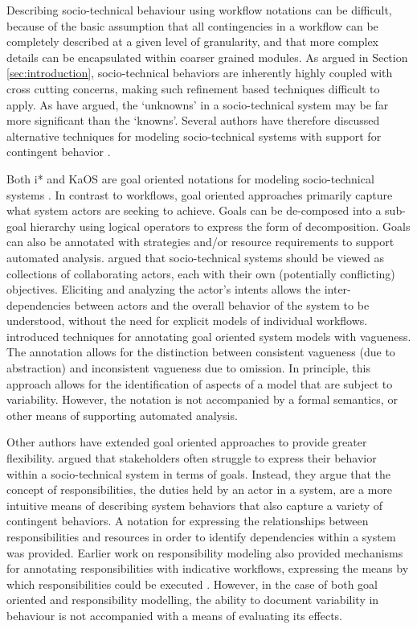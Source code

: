 \documentclass{llncs}
\begin{document}
Describing socio-technical behaviour using workflow notations can be difficult, because of the basic assumption that all
contingencies in a workflow can be completely described at a given level of granularity, and that more complex details
can be encapsulated within coarser grained modules.  As argued in Section \ref{sec:introduction}, socio-technical
behaviors are inherently highly coupled with cross cutting concerns, making such refinement based techniques difficult
to apply.  As \citet{israilidis13ignorance} have argued, the `unknowns' in a socio-technical system may be far more
significant than the `knowns'. Several authors have therefore discussed alternative techniques for modeling
socio-technical systems with support for contingent behavior
\citep{dardenne93goal,sommerville09deriving,voinov13integronsters,yu1995social}.

Both i* \citep{yu1995social} and KaOS \citep{dardenne93goal} are goal oriented notations for modeling socio-technical
systems \cite{werneck2009goreistarkaos}.  In contrast to workflows, goal oriented approaches primarily capture what
system actors are seeking to achieve.  Goals can be de-composed into a sub-goal hierarchy using logical operators to
express the form of decomposition. Goals can also be annotated with strategies and/or resource requirements to support
automated analysis.  \citet{yu1995social} argued that socio-technical systems should be viewed as collections of
collaborating actors, each with their own (potentially conflicting) objectives.  Eliciting and analyzing the actor’s
intents allows the inter-dependencies between actors and the overall behavior of the system to be understood, without
the need for explicit models of individual workflows. \citet{herrmann1999vagueness} introduced techniques for annotating
goal oriented system models with vagueness.  The annotation allows for the distinction between consistent vagueness (due
to abstraction) and inconsistent vagueness due to omission.  In principle, this approach allows for the identification
of aspects of a model that are subject to variability.  However, the notation is not accompanied by a formal semantics,
or other means of supporting automated analysis.

Other authors have extended goal oriented approaches to provide greater flexibility. \citet{sommerville09deriving}
argued that stakeholders often struggle to express their behavior within a socio-technical system in terms of goals.
Instead, they argue that the concept of responsibilities, the duties held by an actor in a system, are a more intuitive
means of describing system behaviors that also capture a variety of contingent behaviors.  A notation for expressing the
relationships between responsibilities and resources in order to identify dependencies within a system was provided.
Earlier work on responsibility modeling also provided mechanisms for annotating responsibilities with indicative
workflows, expressing the means by which responsibilities could be executed \citep{dewsbury07responsibility}.  However,
in the case of both goal oriented and responsibility modelling, the ability to document variability in behaviour is not
accompanied with a means of evaluating its effects.
\end{document}

